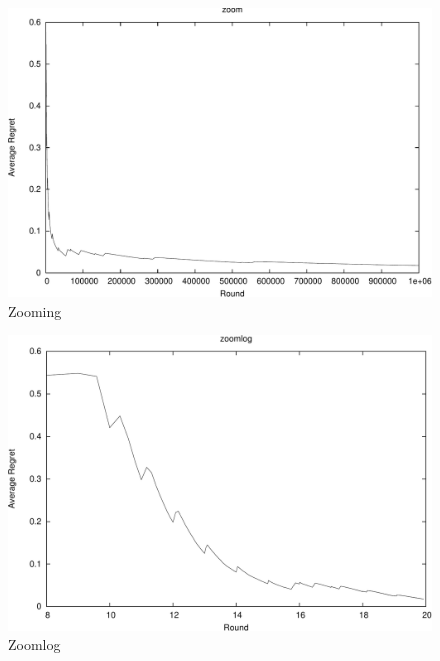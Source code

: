 \documentclass{article}
\begin{document}
\begin{figure}[htb]
  \begin{center}
     \includegraphics[width=\figwidth]{images/zoom-crop.pdf}
     \caption{Zooming}
     \label{fig:zoom}
  \end{center}
\end{figure}

\begin{figure}[htb]
  \begin{center}
     \includegraphics[width=\figwidth]{images/zoomlog-crop.pdf}
     \caption{Zoomlog}
     \label{fig:zoomlog}
  \end{center}
\end{figure}
\end{document}
